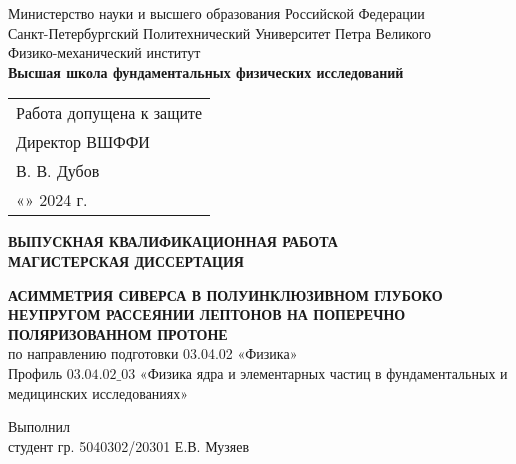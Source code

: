 \begin{titlepage}
\begin{spacing}{1}
    \begin{center}
	Министерство науки и высшего образования Российской Федерации\\Санкт-Петербургский Политехнический Университет Петра Великого \\ Физико-механический институт \\ \textbf{Высшая школа фундаментальных физических исследований} 
\end{center}
\begin{flushright}
\begin{tabular}{l}
Работа допущена к защите\\Директор ВШФФИ \vspace{0.3cm} \\
\underline{\hspace{3.5cm}} В. В. Дубов \vspace{0.5cm}\\
«\underline{\hspace{1cm}}»\underline{\hspace{3cm}} 2024 г.
\end{tabular}
\end{flushright}
\vspace{0.3cm}
{ \begin{center}
\vspace{0.3cm}
\MakeUppercase{\textbf{выпускная квалификационная работа \\ магистерская диссертация}}\\
\vspace{0.3cm}

\MakeUppercase{\textbf{Асимметрия Сиверса в полуинклюзивном глубоко неупругом рассеянии лептонов на поперечно поляризованном протоне}}
\\
\vspace{0.5cm}
по направлению подготовки 03.04.02 «Физика»
\\

Профиль $03.04.02\_03$ «Физика ядра и элементарных частиц в фундаментальных и медицинских исследованиях»
\end{center}
}
\vspace{0.3cm}

\begin{flushleft}
	Выполнил \\
	студент гр. 5040302/20301 \hspace{0.3cm} %
	\hfill  Е.В. Музяев
	\vspace{0.5cm}
	

\end{flushleft}
\end{spacing}
\end{titlepage}
